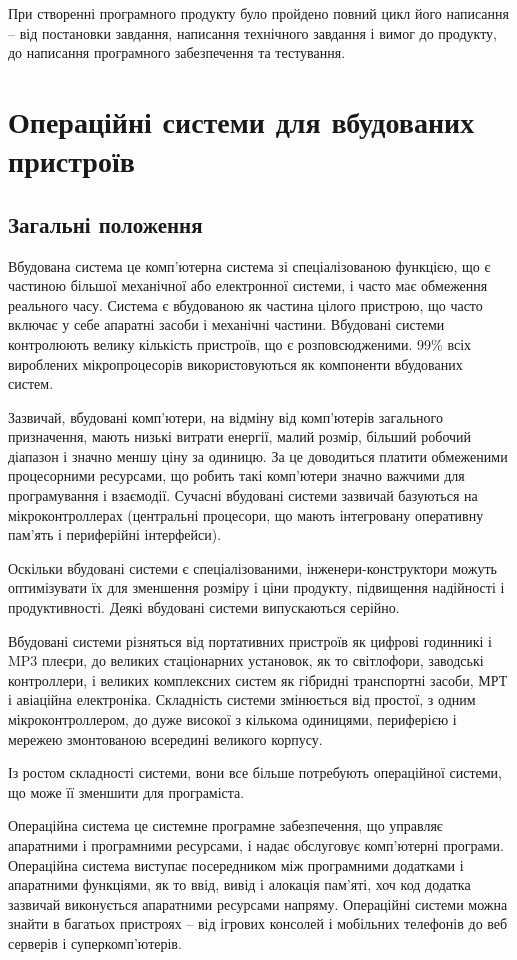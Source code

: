 \documentclass[main.tex]{subfiles}
\begin{document}
При створенні програмного продукту було пройдено повний цикл його написання -- від постановки завдання, написання технічного завдання і вимог до продукту, до написання програмного забезпечення та тестування.

\chapter{Операційні системи для вбудованих пристроїв}
\section{Загальні положення}

Вбудована система це комп'ютерна система зі спеціалізованою функцією, що є частиною більшої механічної або електронної системи, і часто має обмеження реального часу. Система є вбудованою як частина цілого пристрою, що часто включає у себе апаратні засоби і механічні частини. Вбудовані системи контролюють велику кількість пристроїв, що є розповсюдженими. 99\% всіх вироблених мікропроцесорів використовуються як компоненти вбудованих систем\cite{embedded:99}.

Зазвичай, вбудовані комп'ютери, на відміну від комп'ютерів загального призначення, мають низькі витрати енергії, малий розмір, більший робочий діапазон і значно меншу ціну за одиницю. За це доводиться платити обмеженими процесорними ресурсами, що робить такі комп'ютери значно важчими для програмування і взаємодії. Сучасні вбудовані системи зазвичай базуються на мікроконтроллерах (центральні процесори, що мають інтегровану оперативну пам'ять і периферійні інтерфейси).

Оскільки вбудовані системи є спеціалізованими, інженери-конструктори можуть оптимізувати їх для зменшення розміру і ціни продукту, підвищення надійності і продуктивності. Деякі вбудовані системи випускаються серійно.

Вбудовані системи різняться від портативних пристроїв як цифрові годинникі і MP3 плеєри, до великих стаціонарних установок, як то світлофори, заводські контроллери, і великих комплексних систем як гібридні транспортні засоби, МРТ і авіаційна електроніка. Складність системи змінюється від простої, з одним мікроконтроллером, до дуже високої з кількома одиницями, периферією і мережею змонтованою всередині великого корпусу.

Із ростом складності системи, вони все більше потребують операційної системи, що може її зменшити для програміста.

Операційна система це системне програмне забезпечення, що управляє апаратними і програмними ресурсами, і надає обслуговує комп'ютерні програми. Операційна система виступає посередником між програмними додатками і апаратними функціями, як то ввід, вивід і алокація пам'яті, хоч код додатка зазвичай виконується апаратними ресурсами напряму. Операційні системи можна знайти в багатьох пристроях -- від ігрових консолей і мобільних телефонів до веб серверів і суперкомп'ютерів.
\end{document}
